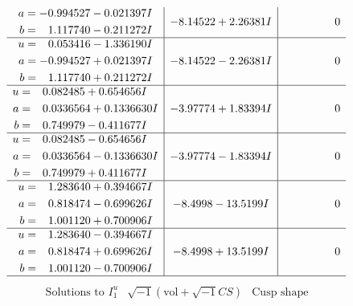 \documentclass[1p]{elsarticle_modified}
\theoremstyle{definition}
\newcommand{\I}{\sqrt{-1}}
\begin{document}
$$\begin{array}{c|c|c}
\begin{aligned}
a &= -0.994527 - 0.021397 I \\
b &= \phantom{-}1.117740 - 0.211272 I\end{aligned}
 & -8.14522 + 2.26381 I & \phantom{-0.000000 } 0 \\ \hline\begin{aligned}
u &= \phantom{-}0.053416 - 1.336190 I \\
a &= -0.994527 + 0.021397 I \\
b &= \phantom{-}1.117740 + 0.211272 I\end{aligned}
 & -8.14522 - 2.26381 I & \phantom{-0.000000 } 0 \\ \hline\begin{aligned}
u &= \phantom{-}0.082485 + 0.654656 I \\
a &= \phantom{-}0.0336564 + 0.1336630 I \\
b &= \phantom{-}0.749979 - 0.411677 I\end{aligned}
 & -3.97774 + 1.83394 I & \phantom{-0.000000 } 0 \\ \hline\begin{aligned}
u &= \phantom{-}0.082485 - 0.654656 I \\
a &= \phantom{-}0.0336564 - 0.1336630 I \\
b &= \phantom{-}0.749979 + 0.411677 I\end{aligned}
 & -3.97774 - 1.83394 I & \phantom{-0.000000 } 0 \\ \hline\begin{aligned}
u &= \phantom{-}1.283640 + 0.394667 I \\
a &= \phantom{-}0.818474 - 0.699626 I \\
b &= \phantom{-}1.001120 + 0.700906 I\end{aligned}
 & -8.4998 - 13.5199 I & \phantom{-0.000000 } 0 \\ \hline\begin{aligned}
u &= \phantom{-}1.283640 - 0.394667 I \\
a &= \phantom{-}0.818474 + 0.699626 I \\
b &= \phantom{-}1.001120 - 0.700906 I\end{aligned}
 & -8.4998 + 13.5199 I & \phantom{-0.000000 } 0\\
 \hline 
 \end{array}$$\newpage$$\begin{array}{c|c|c}  
\text{Solutions to }I^u_{1}& \I (\text{vol} + \sqrt{-1}CS) & \text{Cusp shape}\\
 \hline 
\begin{aligned}

\end{aligned}
\end{array}$$
\end{document}
